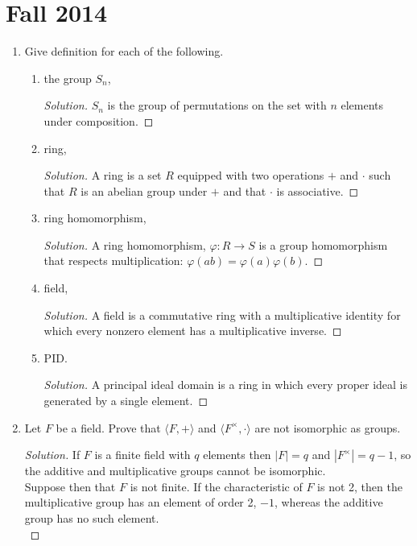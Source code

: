 \documentclass[11pt,letterpaper]{report}
\newenvironment{solution}
{\begin{proof}[Solution]}
{\end{proof}}
\begin{document}
\section{Fall 2014}
\begin{enumerate}
	\item Give definition for each of the following.
	\begin{enumerate}
		\item the group $S_n$,
		\begin{solution}
			$S_n$ is the group of permutations on the set with $n$ elements under composition.
		\end{solution}
		\item ring,
		\begin{solution}
			A ring is a set $R$ equipped with two operations $+$ and $\cdot$ such that $R$ is an abelian group under $+$ and that $\cdot$ is associative.
		\end{solution}
		\item ring homomorphism,
		\begin{solution}
			A ring homomorphism, $\varphi: R\to S$ is a group homomorphism that respects multiplication: $\varphi(ab) = \varphi(a)\varphi(b)$.
		\end{solution}
		\item field,
		\begin{solution}
			A field is a commutative ring with a multiplicative identity for which every nonzero element has a multiplicative inverse.
		\end{solution}
		\item PID.
		\begin{solution}
			A principal ideal domain is a ring in which every proper ideal is generated by a single element.
		\end{solution}
	\end{enumerate}

	\item Let $F$ be a field. Prove that $\langle F, +\rangle$ and $\langle F^\times, \cdot \rangle$ are not isomorphic as groups.
	\begin{solution}
		If $F$ is a finite field with $q$ elements then $|F| = q$ and $|F^\times| = q-1$, so the additive and multiplicative groups cannot be isomorphic.\\

		Suppose then that $F$ is not finite. If the characteristic of $F$ is not 2, then the multiplicative group has an element of order 2, $-1$, whereas the additive group has no such element.\\


\end{solution}
\end{enumerate}
\end{document}
